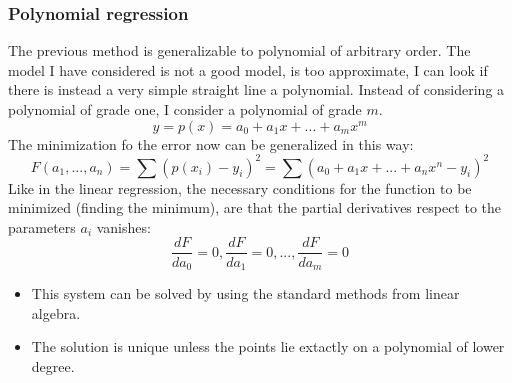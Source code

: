 \documentclass{article}
\begin{document}
\subsubsection{Polynomial regression}
The previous method is generalizable to polynomial of arbitrary order.
The model I have considered is not a good model, is too approximate, I can look if there
is instead a very simple straight line a polynomial.
Instead of considering a polynomial of grade one, I consider a polynomial of grade $m$.
$$y=p(x)=a_0+a_1x+...+a_m x^m$$
The minimization fo the error now can be generalized in this way:
$$F(a_1,...,a_n)=\sum (p(x_i)-y_i)^2=\sum(a_0+a_1x+...+a_n x^n-y_i)^2$$
Like in the linear regression, the necessary conditions for the function to be
minimized (finding the minimum), are that the partial derivatives respect to the
parameters $a_i$ vanishes:
$$\frac{dF}{da_0}=0,\frac{dF}{da_1}=0,...,\frac{dF}{da_m}=0$$
\begin{itemize}
    \item This system can be solved by using the standard methods from linear algebra.
    \item The solution is unique unless the points lie extactly on a polynomial of
          lower degree.
\end{itemize}
\end{document}
